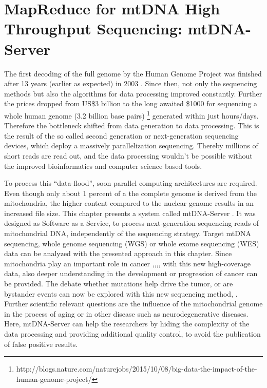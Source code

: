 \chapter{MapReduce for mtDNA High Throughput Sequencing: mtDNA-Server}
\label{chap:NGS}

The first decoding of the full genome by the Human Genome Project was finished after 13 years (earlier as expected) in 2003 \cite{InternationalHumanGenomeSequencingConsortium2004}. Since then, not only the sequencing methods but also the algorithms for data processing improved constantly. Further the prices dropped from US\$3 billion to the long awaited \$1000 for sequencing a whole human genome (3.2 billion base pairs) \footnote{http://blogs.nature.com/naturejobs/2015/10/08/big-data-the-impact-of-the-human-genome-project/} generated within just hours/days. Therefore the bottleneck shifted from data generation to data processing. This is the result of the so called second generation or next-generation sequencing devices, which deploy a massively parallelization sequencing. Thereby millions of short reads are read out, and the data processing wouldn't be possible without the improved bioinformatics and computer science based tools. 

To process this "`data-flood"', soon parallel computing architectures are required. Even though only about 1 percent of a the complete genome is derived from the mitochondria, the higher content compared to the nuclear genome results in an increased file size. This chapter presents a system called mtDNA-Server \cite{Weissensteiner2016b}. It was designed as Software as a Service, to process next-generation sequencing reads of mitochondrial DNA, independently of the sequencing strategy. Target mtDNA sequencing, whole genome sequencing (WGS) or whole exome sequencing (WES) data can be analyzed with the presented approach in this chapter. Since mitochondria play an important role in cancer \cite{Brandon2006},\cite{He2010},\cite{Guo2012},\cite{KlossBrandstatter2010}, with this new high-coverage data, also deeper understanding in the development or progression of cancer can be provided. The debate whether mutations help drive the tumor, or are bystander events can now be explored with this new sequencing method\cite{McMahon2014}, \cite{Kloss-Brandstatter2015}. Further scientific relevant questions are the influence of the mitochondrial genome in the process of aging or in other disease such as neurodegenerative diseases. Here, mtDNA-Server can help the researchers by hiding the complexity of the data processing and providing additional quality control, to avoid the publication of false positive results. 

